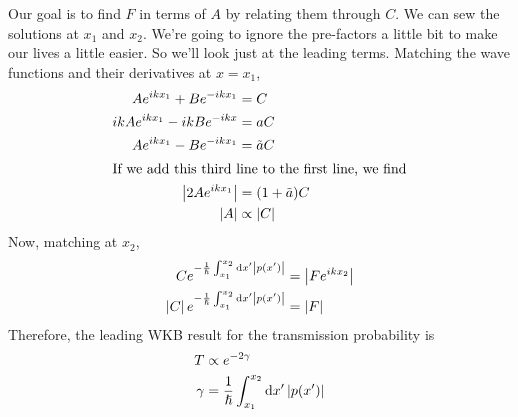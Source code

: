 \documentclass[a4paper]{article}
\begin{document}
Our goal is to find $F$ in terms of $A$ by relating them through $C$. We can
sew the solutions at $x_1$ and $x_2$. We're going to ignore the pre-factors a
little bit to make our lives a little easier. So we'll look just at the leading
terms. Matching the wave functions and their derivatives at $x=x_1$,
\begin{align*}
	Ae^{ikx_1} + Be^{-ikx_1} &= C\\
	ikAe^{ikx_1} - ikBe^{-ikx} &= aC\\
	Ae^{ikx_1} - Be^{-ikx_1} &= \tilde{a}C\\
	\intertext{If  we add this third line to the first line, we find}
	\left\lvert 2Ae^{ikx_1}\right\rvert &= {(1+\tilde{a})C}\\
	\left\lvert A\right\rvert &\propto \left\lvert C\right\rvert
\end{align*}
Now, matching at $x_2$,
\begin{align*}
	Ce^{-\frac{1}{\hslash}\int_{x_1}^{x_2}\mathrm{d} x'\left\lvert p(x')\right\rvert} &=
	\left\lvert Fe^{ikx_2}\right\rvert\\
	\left\lvert C\right\rvert e^{-\frac{1}{\hslash}\int_{x_1}^{x_2}\mathrm{d} x'\left\lvert p(x')\right\rvert} &=
	\left\lvert F\right\rvert\\
\end{align*}
Therefore, the leading WKB result for the transmission probability is
\begin{align*}
	T &\propto e^{-2\gamma}\\
	\gamma &= \frac{1}{\hslash}\int_{x_1}^{x_2}\mathrm{d} x'\left\lvert p(x')\right\rvert
\end{align*}
\end{document}
